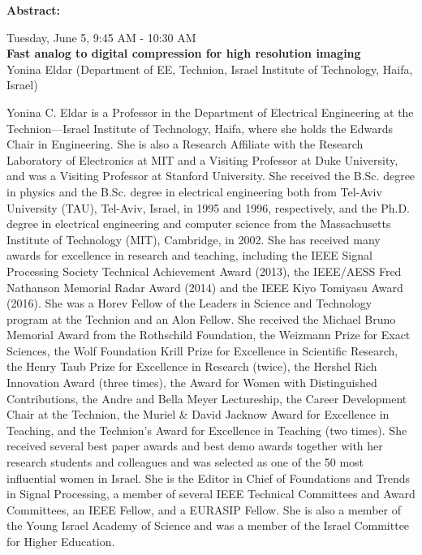 \textbf{Abstract:}\\

  


\newpage\vspace{2cm}
\begin{center}{\Large{
      Tuesday, June 5, 9:45 AM - 10:30 AM \\
      \textbf{Fast analog to digital compression for high resolution imaging}\\
      Yonina Eldar (Department of EE, Technion, Israel Institute of Technology, Haifa, Israel)  
}}
\end{center}
\vspace{1cm}

\begin{wrapfloat}{figure}{o}{0pt}
  \texttt{[image: \{images/speakers/yonina@ee.technion.ac.il]}.jpg}
\end{wrapfloat}

Yonina C. Eldar is a Professor in the Department of Electrical Engineering at the Technion—Israel Institute of Technology, Haifa, where she holds the Edwards Chair in Engineering. She is
also a Research Affiliate with the Research Laboratory of Electronics at MIT and a Visiting Professor at Duke University, and was a Visiting Professor at Stanford University. She received the B.Sc. degree in physics and the B.Sc. degree in electrical engineering both from Tel-Aviv University (TAU), Tel-Aviv, Israel, in 1995 and 1996, respectively, and the Ph.D. degree in electrical engineering and computer science from the Massachusetts Institute of Technology (MIT), Cambridge, in 2002.
She has received many awards for excellence in research and teaching, including
the IEEE Signal Processing Society Technical Achievement Award (2013), the IEEE/AESS Fred Nathanson Memorial Radar Award (2014) and the IEEE Kiyo Tomiyasu Award (2016).
She was a Horev Fellow of the Leaders in Science and Technology program at the Technion and an Alon Fellow. She received the Michael Bruno Memorial Award from the Rothschild Foundation, the Weizmann Prize for Exact Sciences, the Wolf Foundation Krill Prize for Excellence in Scientific Research, the Henry Taub Prize for Excellence in Research (twice), the Hershel Rich Innovation Award (three times), the Award for Women with Distinguished Contributions, the Andre and Bella Meyer Lectureship, the Career Development Chair at the Technion, the Muriel \& David Jacknow Award for Excellence in Teaching, and the Technion’s Award for Excellence in Teaching (two times). She received several best paper awards and best demo awards together with her research students and colleagues and was selected as one of the 50 most influential women in Israel.
She is the Editor in Chief of Foundations and Trends in Signal Processing, a member of several IEEE Technical Committees and Award Committees, an IEEE Fellow, and a EURASIP Fellow.
She is also a member of the Young Israel Academy of Science and was a member of the Israel Committee for Higher Education.  
\\\\

